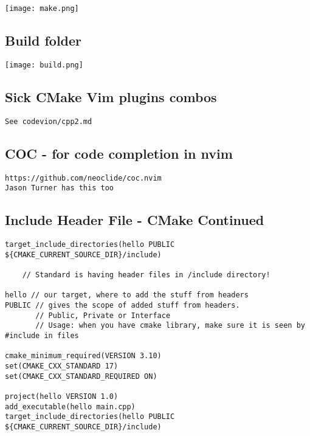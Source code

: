 \begin{center}
    \texttt{[image: make.png]}
\end{center}

\subsection{Build folder}

\begin{center}
    \texttt{[image: build.png]}
\end{center}

\subsection{Sick CMake Vim plugins combos}

\begin{verbatim}
See codevion/cpp2.md
\end{verbatim}

\subsection{COC - for code completion in nvim}
\begin{verbatim}
https://github.com/neoclide/coc.nvim
Jason Turner has this too
\end{verbatim}

\subsection{Include Header File - CMake Continued}

\begin{verbatim}
target_include_directories(hello PUBLIC ${CMAKE_CURRENT_SOURCE_DIR}/include)

    // Standard is having header files in /include directory!

hello // our target, where to add the stuff from headers
PUBLIC // gives the scope of added stuff from headers. 
       // Public, Private or Interface
       // Usage: when you have cmake library, make sure it is seen by #include in files

cmake_minimum_required(VERSION 3.10)
set(CMAKE_CXX_STANDARD 17)
set(CMAKE_CXX_STANDARD_REQUIRED ON)

project(hello VERSION 1.0)
add_executable(hello main.cpp)
target_include_directories(hello PUBLIC ${CMAKE_CURRENT_SOURCE_DIR}/include)
\end{verbatim}

